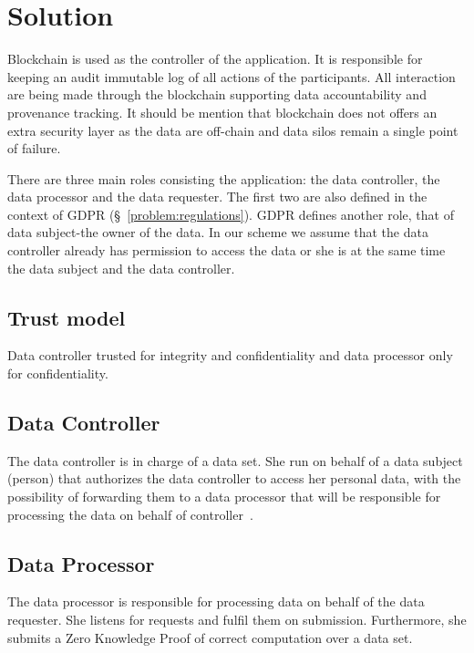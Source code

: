 \chapter{Solution}
\label{solution}

Blockchain is used as the controller of the application. It is responsible for keeping an
audit immutable log of all actions of the participants. All interaction are being made
through the blockchain supporting data accountability and provenance tracking. It should be mention that blockchain does not offers an extra security layer as the data are off-chain and data silos remain a single point of failure.

There are three main roles consisting the application: the data controller, the data processor
and the data requester. The first two are also defined in the context of GDPR (§~\ref{problem:regulations}).
GDPR defines another role, that of data subject-the owner of the data.
In our scheme we assume that the data controller already has permission to access the data or
she is at the same time the data subject and the data controller.

\section{Trust model}
\label{solution:trust_model}

Data controller trusted for integrity and confidentiality and data processor only for confidentiality.

\section{Data Controller}
\label{solution:data_controller}

The data controller is in charge of a data set. She run on behalf of a data subject (person)
that authorizes the data controller to access her personal data, with the possibility of forwarding
them to a data processor that will be responsible for processing the data on behalf of controller~\cite{DBLP:journals/corr/NeisseSF17}.

\section{Data Processor}
\label{solution:data_processor}

The data processor is responsible for processing data on behalf of the data requester. She listens
for requests and fulfil them on submission. Furthermore, she submits a Zero Knowledge Proof of correct computation over a data set.

